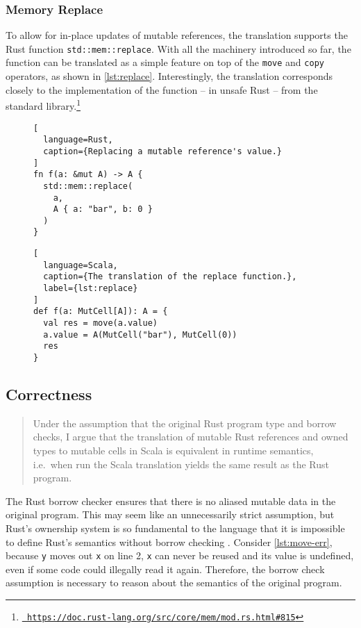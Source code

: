 \subsubsection{Memory Replace}

To allow for in-place updates of mutable references, the translation supports
the  Rust function \lstinline!std::mem::replace!. With all the machinery
introduced so far, the function can be translated as a simple feature on top of
the \lstinline!move! and \lstinline!copy! operators, as shown in
\autoref{lst:replace}. Interestingly, the translation corresponds closely to the
implementation of the function -- in unsafe Rust -- from the standard
library.\footnote{\href{}{\texttt{\color{MidnightBlue}
https://doc.rust-lang.org/src/core/mem/mod.rs.html\#815}}}

\begin{figure}
\noindent\begin{minipage}[t]{.42\textwidth}
\begin{lstlisting}[
  language=Rust,
  caption={Replacing a mutable reference's value.}
]
fn f(a: &mut A) -> A {
  std::mem::replace(
    a,
    A { a: "bar", b: 0 }
  )
}
\end{lstlisting}
\end{minipage}\hfill
\begin{minipage}[t]{.55\textwidth}
\begin{lstlisting}[
  language=Scala,
  caption={The translation of the replace function.},
  label={lst:replace}
]
def f(a: MutCell[A]): A = {
  val res = move(a.value)
  a.value = A(MutCell("bar"), MutCell(0))
  res
}
\end{lstlisting}
\end{minipage}
\end{figure}



\subsection{Correctness}
\label{correctness-claim}

\begin{quote}
Under the assumption that the original Rust program type and borrow checks, I
argue that the translation of mutable Rust references and owned types to mutable
cells in Scala is equivalent in runtime semantics, i.e.~when run the Scala
translation yields the same result as the Rust program.
\end{quote}

The Rust borrow checker ensures that there is no aliased mutable data in the
original program. This may seem like an unnecessarily strict assumption, but
Rust's ownership system is so fundamental to the language that it is impossible
to define Rust's semantics without borrow checking \cite{krust}. Consider
\autoref{lst:move-err}, because \lstinline!y! moves out \lstinline!x! on line 2,
\lstinline!x! can never be reused and its value is undefined, even if some code
could illegally read it again. Therefore, the borrow check assumption is
necessary to reason about the semantics of the original program.

